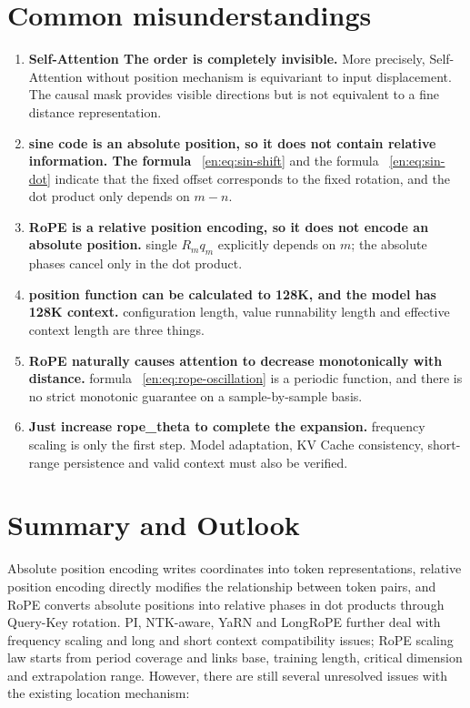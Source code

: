 \documentclass[UTF8,fontset=none,a4paper,10pt]{ctexart}
\begin{document}
\section{Common misunderstandings}

\begin{enumerate}
\item \textbf{Self-Attention The order is completely invisible. } More precisely, Self-Attention without position mechanism is equivariant to input displacement. The causal mask provides visible directions but is not equivalent to a fine distance representation.
\item \textbf{ sine code is an absolute position, so it does not contain relative information. The formula } ~\eqref{en:eq:sin-shift} and the formula ~\eqref{en:eq:sin-dot} indicate that the fixed offset corresponds to the fixed rotation, and the dot product only depends on $m-n$.
\item \textbf{RoPE is a relative position encoding, so it does not encode an absolute position. } single $R_mq_m$ explicitly depends on $m$; the absolute phases cancel only in the dot product.
\item \textbf{ position function can be calculated to 128K, and the model has 128K context. } configuration length, value runnability length and effective context length are three things.
\item \textbf{RoPE naturally causes attention to decrease monotonically with distance. } formula ~\eqref{en:eq:rope-oscillation} is a periodic function, and there is no strict monotonic guarantee on a sample-by-sample basis.
\item \textbf{ Just increase \textnormal{rope\_theta} to complete the expansion. } frequency scaling is only the first step. Model adaptation, KV Cache consistency, short-range persistence and valid context must also be verified.
\end{enumerate}

\section{Summary and Outlook}

Absolute position encoding writes coordinates into token representations, relative position encoding directly modifies the relationship between token pairs, and RoPE converts absolute positions into relative phases in dot products through Query-Key rotation. PI, NTK-aware, YaRN and LongRoPE further deal with frequency scaling and long and short context compatibility issues; RoPE scaling law starts from period coverage and links base, training length, critical dimension and extrapolation range. However, there are still several unresolved issues with the existing location mechanism:
\end{document}
